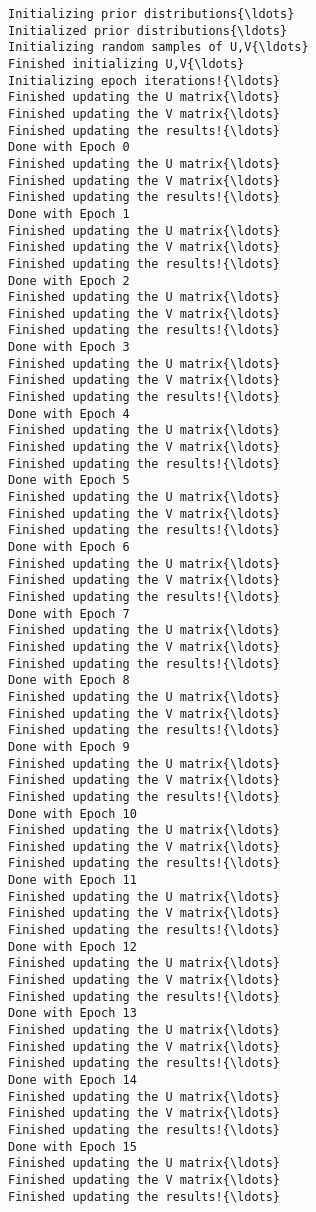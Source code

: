 \documentclass{article}
\begin{document}
    \begin{Verbatim}[commandchars=\\\{\}]
Initializing prior distributions{\ldots}
Initialized prior distributions{\ldots}
Initializing random samples of U,V{\ldots}
Finished initializing U,V{\ldots}
Initializing epoch iterations!{\ldots}
Finished updating the U matrix{\ldots}
Finished updating the V matrix{\ldots}
Finished updating the results!{\ldots}
Done with Epoch 0
Finished updating the U matrix{\ldots}
Finished updating the V matrix{\ldots}
Finished updating the results!{\ldots}
Done with Epoch 1
Finished updating the U matrix{\ldots}
Finished updating the V matrix{\ldots}
Finished updating the results!{\ldots}
Done with Epoch 2
Finished updating the U matrix{\ldots}
Finished updating the V matrix{\ldots}
Finished updating the results!{\ldots}
Done with Epoch 3
Finished updating the U matrix{\ldots}
Finished updating the V matrix{\ldots}
Finished updating the results!{\ldots}
Done with Epoch 4
Finished updating the U matrix{\ldots}
Finished updating the V matrix{\ldots}
Finished updating the results!{\ldots}
Done with Epoch 5
Finished updating the U matrix{\ldots}
Finished updating the V matrix{\ldots}
Finished updating the results!{\ldots}
Done with Epoch 6
Finished updating the U matrix{\ldots}
Finished updating the V matrix{\ldots}
Finished updating the results!{\ldots}
Done with Epoch 7
Finished updating the U matrix{\ldots}
Finished updating the V matrix{\ldots}
Finished updating the results!{\ldots}
Done with Epoch 8
Finished updating the U matrix{\ldots}
Finished updating the V matrix{\ldots}
Finished updating the results!{\ldots}
Done with Epoch 9
Finished updating the U matrix{\ldots}
Finished updating the V matrix{\ldots}
Finished updating the results!{\ldots}
Done with Epoch 10
Finished updating the U matrix{\ldots}
Finished updating the V matrix{\ldots}
Finished updating the results!{\ldots}
Done with Epoch 11
Finished updating the U matrix{\ldots}
Finished updating the V matrix{\ldots}
Finished updating the results!{\ldots}
Done with Epoch 12
Finished updating the U matrix{\ldots}
Finished updating the V matrix{\ldots}
Finished updating the results!{\ldots}
Done with Epoch 13
Finished updating the U matrix{\ldots}
Finished updating the V matrix{\ldots}
Finished updating the results!{\ldots}
Done with Epoch 14
Finished updating the U matrix{\ldots}
Finished updating the V matrix{\ldots}
Finished updating the results!{\ldots}
Done with Epoch 15
Finished updating the U matrix{\ldots}
Finished updating the V matrix{\ldots}
Finished updating the results!{\ldots}

\end{Verbatim}
\end{document}
